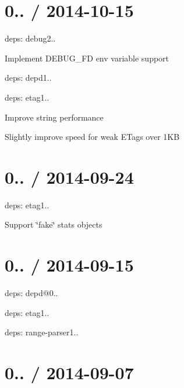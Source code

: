 \section*{0.. / 2014-\/10-\/15 }


\begin{DoxyItemize}
\item deps\+: debug2..
\begin{DoxyItemize}
\item Implement {\ttfamily D\+E\+B\+U\+G\+\_\+\+FD} env variable support
\end{DoxyItemize}
\item deps\+: depd1..
\item deps\+: etag1..
\begin{DoxyItemize}
\item Improve string performance
\item Slightly improve speed for weak E\+Tags over 1\+KB
\end{DoxyItemize}
\end{DoxyItemize}

\section*{0.. / 2014-\/09-\/24 }


\begin{DoxyItemize}
\item deps\+: etag1..
\begin{DoxyItemize}
\item Support \char`\"{}fake\char`\"{} stats objects
\end{DoxyItemize}
\end{DoxyItemize}

\section*{0.. / 2014-\/09-\/15 }


\begin{DoxyItemize}
\item deps\+: depd@0..
\item deps\+: etag1..
\item deps\+: range-\/parser1..
\end{DoxyItemize}

\section*{0.. / 2014-\/09-\/07 }


